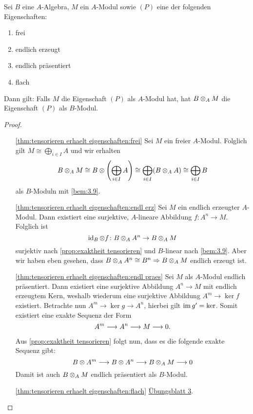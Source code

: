 \documentclass[12pt,a4paper]{scrartcl}
\theoremstyle{cplain}
\theoremstyle{cdef}
\begin{document}
\begin{satz}
	Sei $B$ eine $A$-Algebra, $M$ ein $A$-Modul sowie $(P)$ eine der folgenden Eigenschaften:
	\begin{enumerate}
		\item frei \label{thm:tensorieren erhaelt eigenschaften:frei}
		\item endlich erzeugt \label{thm:tensorieren erhaelt eigenschaften:endl erz}
		\item endlich präsentiert \label{thm:tensorieren erhaelt eigenschaften:endl praes}
		\item flach \label{thm:tensorieren erhaelt eigenschaften:flach}
	\end{enumerate}	
	Dann gilt: Falls $M$ die Eigenschaft $(P)$ als $A$-Modul hat, hat $B\otimes_AM$ die Eigenschaft $(P)$ als $B$-Modul.
\end{satz}
\begin{proof}
	\leavevmode
	\begin{enumerate}
		\item[\ref{thm:tensorieren erhaelt eigenschaften:frei}] Sei $M$ ein freier $A$-Modul. Folglich gilt $M \cong \bigoplus_{i\in I}A$ und wir erhalten \[B\otimes_AM\cong B\otimes \left(\bigoplus_{i\in I}A\right) \cong \bigoplus_{i\in I}(B\otimes_A A) \cong \bigoplus_{i\in I} B\] als $B$-Moduln mit \cref{bem:3.9}.
		\item[\ref{thm:tensorieren erhaelt eigenschaften:endl erz}] Sei $M$ ein endlich erzeugter $A$-Modul. Dann existiert eine surjektive, $A$-lineare Abbildung $f\colon A^n\to M$. Folglich ist
		$$\operatorname{id}_B\otimes f\colon B\otimes_AA^n\to B\otimes_AM$$ surjektiv nach \cref{prop:exaktheit tensorieren} und $B$-linear nach \cref{bem:3.9}. Aber wir haben eben gesehen, dass $B\otimes_AA^n \cong B^n\Rightarrow B\otimes_AM$ endlich erzeugt ist.
		\item[\ref{thm:tensorieren erhaelt eigenschaften:endl praes}] Sei $M$ als $A$-Modul endlich präsentiert. Dann existiert eine surjektive Abbildung $A^n \to M$ mit endlich erzeugtem Kern, weshalb wiederum eine surjektive Abbildung $A^m \to \ker f$ existiert. Betrachte nun $A^m \to \ker g \to A^n$, hierbei gilt $\operatorname{im} g' = \operatorname{ker}$. Somit existiert eine exakte Sequenz der Form
		\[ A^m \longrightarrow A^n \longrightarrow M\longrightarrow 0. \]
		
		Aus \cref{prop:exaktheit tensorieren} folgt nun, dass es die folgende exakte Sequenz gibt:
		$$B\otimes A^m \longrightarrow B\otimes A^n \longrightarrow B\otimes_AM\longrightarrow 0$$
		Damit ist auch $B\otimes_AM$ endlich präsentiert als $B$-Modul.
		\item[\ref{thm:tensorieren erhaelt eigenschaften:flach}] \href{http://www.math.uni-bonn.de/ag/stroppel/Franzen_Algebra_1_Uebung/Blatt3.pdf}{Übungsblatt 3}.
		\qedhere
	\end{enumerate}
\end{proof}
\end{document}
